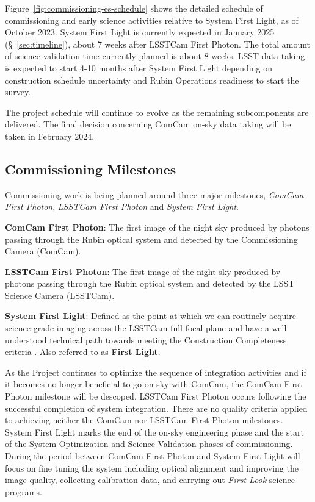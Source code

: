 Figure~\ref{fig:commissioning-es-schedule} shows the detailed schedule of commissioning and early science activities relative to System First Light, as of October 2023.
System First Light is currently expected in January 2025 (\S~\ref{sec:timeline}), about 7 weeks after LSSTCam First Photon.
The total amount of science validation time currently planned is about 8 weeks.  
LSST data taking is expected to start 4-10 months after System First Light depending on construction schedule uncertainty and Rubin Operations readiness to start the survey. 

The project schedule will continue to evolve as the remaining subcomponents are delivered. 
The final decision concerning ComCam on-sky data taking will be taken in February 2024.

\subsection{Commissioning Milestones}
\label{ssec:commissioning-milestones}

Commissioning work is being planned around three major milestones, \textit{ComCam First Photon}, \textit{LSSTCam First Photon} and \textit{System First Light}. 

\textbf{ComCam First Photon}: The first image of the night sky produced by photons passing through the Rubin optical system and detected by the Commissioning Camera (ComCam).

\textbf {LSSTCam First Photon}: The first image of the night sky produced by photons passing through the Rubin optical system and detected by the LSST Science Camera (LSSTCam).

\textbf {System First Light}: Defined as the point at which we can routinely acquire science-grade imaging across the LSSTCam full focal plane and have a well understood technical path towards meeting the Construction Completeness criteria   .
Also referred to as \textbf{First Light}. 

As the Project continues to optimize the sequence of integration activities and if it becomes no longer beneficial to go on-sky with ComCam, the ComCam First Photon milestone will be descoped. 
LSSTCam First Photon occurs following the successful completion of system integration. 
There are no quality criteria applied to achieving  neither the ComCam nor LSSTCam First Photon milestones. 
System First Light  marks the end of the  on-sky engineering phase and the start of the System Optimization and Science Validation phases of commissioning.
During the period between ComCam First Photon and System First Light will focus on fine tuning the system including optical alignment and improving the image quality, collecting calibration data, and carrying out \textit{First Look} science programs. 

